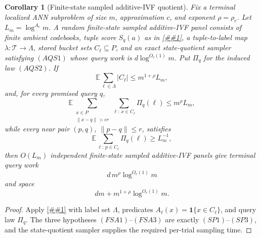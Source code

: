 \documentclass[10pt]{article}
\newcommand{\cref}[1]{\ref{##1}}
\newtheorem{corollary}[theorem]{Corollary}
\theoremstyle{definition}
\newcommand{\E}{\mathbb{E}}
\begin{document}
\begin{corollary}[Finite-state sampled additive-IVF quotient]
   \label{cor:finite-state-sampled-aq}
   Fix a terminal localized ANN subproblem of size \(m\), approximation \(c\),
   and exponent \(\rho=\rho_c\).  Let \(L_m=\log^{A_c}m\).  A random
   finite-state sampled additive-IVF panel consists of finite ambient codebooks,
   tuple score \(S_q(a)\) as in \cref{lem:gibbs-aq-state-quotient}, a
   tuple-to-label map \(\lambda:\mathcal T\to\Lambda\), stored bucket sets
   \(C_\ell\subseteq P\), and an exact state-quotient sampler satisfying
   \((AQS1)\) whose query work is \(d\log^{O_c(1)}m\).  Put \(\Pi_q\) for the
   induced law \((AQS2)\).  If
   \[
      \E\sum_{\ell\in\Lambda}|C_\ell|
      \le m^{1+\rho}L_m,
      \tag{FSA1}
   \]
   and, for every promised query \(q\),
   \[
      \E
      \sum_{\substack{x\in P\\ \|x-q\|>cr}}
      \sum_{\ell:\,x\in C_\ell}\Pi_q(\ell)
      \le m^\rho L_m,
      \tag{FSA2}
   \]
   while every near pair \((p,q)\), \(\|p-q\|\le r\), satisfies
   \[
      \E
      \sum_{\ell:\,p\in C_\ell}\Pi_q(\ell)
      \ge L_m^{-1},
      \tag{FSA3}
   \]
   then \(O(L_m)\) independent finite-state sampled additive-IVF panels give
   terminal query work
   \[
      d\,m^\rho\log^{O_c(1)}m
   \]
   and space
   \[
      dm+m^{1+\rho}\log^{O_c(1)}m .
   \]
\end{corollary}

\begin{proof}
   Apply \cref{prop:sampled-structured-panel} with label set \(\Lambda\),
   predicates \(A_\ell(x)=\mathbf 1\{x\in C_\ell\}\), and query law \(\Pi_q\).
   The three hypotheses \((FSA1)\)--\((FSA3)\) are exactly
   \((SP1)\)--\((SP3)\), and the state-quotient sampler supplies the required
   per-trial sampling time.
\end{proof}
\end{document}
